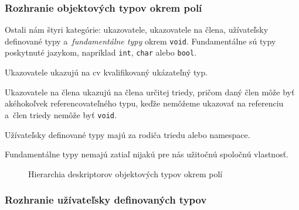 \subsubsection{Rozhranie objektových typov okrem polí}

Ostali nám štyri kategórie: ukazovatele, ukazovatele na člena, užívateľsky definované typy a~\emph{fundamentálne typy} okrem \texttt{void}. Fundamentálne sú typy poskytnuté jazykom, napríklad \texttt{int}, \texttt{char} alebo \texttt{bool}.

Ukazovatele ukazujú na cv kvalifikovaný ukázateľný typ.

Ukazovatele na člena ukazujú na člena určitej triedy, pričom daný člen môže byť akéhokoľvek referencovateľného typu, keďže nemôžeme ukazovať na referenciu a~člen triedy nemôže byť \texttt{void}.

Užívateľsky definované typy majú za rodiča triedu alebo namespace.

Fundamentálne typy nemajú zatiaľ nijakú pre nás užitočnú spoločnú vlastnosť.

\begin{figure}[H]
\begin{center}
\caption{Hierarchia deskriptorov objektových typov okrem polí}
\end{center}
\end{figure}

\subsubsection{Rozhranie užívateľsky definovaných typov}

